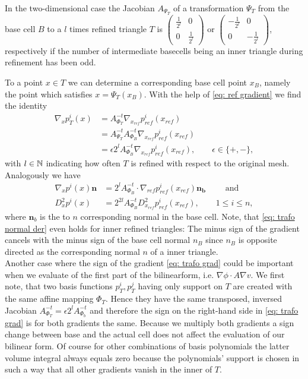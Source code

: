 \begin{example}\label{ex: leaf cell trafo}
In the two-dimensional case the Jacobian $A_{\Psi_T}$ of a transformation $\Psi_T$ from the base cell $B$ to a $l$ times refined triangle $T$ is $
	\begin{pmatrix}
		\frac 1 {2^l} & 0 \\ 0 & \frac 1 {2^l}
	\end{pmatrix} \text{ or }
	\begin{pmatrix}
		-\frac 1 {2^l} & 0 \\ 0 & -\frac 1 {2^l}
	\end{pmatrix}$, respectively if the number of intermediate basecells being an inner triangle during refinement  has been odd.

 To a point $x \in T$ we can determine a corresponding base cell point $x_B$, namely the point which satisfies $x = \Psi_T(x_B)$. With the help of \eqref{eq: ref gradient} we find the identity
\begin{align}
\nabla_x p_T^i(x) &= A_{\Phi_T}^{-t} \nabla_{x_{ref}} p^i_{ref} (x_{ref}) \nonumber\\
 &= A_{\Psi_T}^{-t} A_{\Phi_B}^{-t} \nabla_{x_{ref}} p^i_{ref} (x_{ref}) \nonumber\\
&= \epsilon 2^l A_{\Phi_B}^{-t} \nabla_{x_{ref}} p^i_{ref}(x_{ref}), \qquad \epsilon \in \{+,-\} \label{eq: trafo grad},
\end{align}
with $l \in \mathbb{N}$ indicating how often $T$ is refined with respect to the original mesh.\\
Analogously we have
\begin{align}
\nabla_x p^i(x) \mathbf n &= 2^l  A_{\Phi_B}^{-t} \cdot \nabla_{ref}p^i_{ref}(x_{ref}) \mathbf{ n_{b}} \qquad \text{ and } \label{eq: trafo normal der} \\
D_x^2 p^i(x) &= 2^{2l}  A_{\Phi_B}^{-t} D_{x_{ref}}^2 p^i_{ref}(x_{ref}), \qquad 1 \leq i \leq n,
\end{align}
where $\mathbf n_b$ is the to $n$ corresponding normal in the base cell. Note, that \eqref{eq: trafo normal der} even holds for inner refined triangles: The minus sign of the gradient cancels with the minus sign of the base cell normal $n_B$ since $n_B$ is opposite directed as the corresponding normal $n$ of a inner triangle.\\
Another case where the sign of the gradient \eqref{eq: trafo grad} could be important when we evaluate of the first part of the bilinearform, i.e. $\nabla \phi \cdot A \nabla v$. We first note, that two basis functions $p_T^i, p_T^j$ having only support on $T$ are created with the same affine mapping $\Phi_T$. Hence they have the same transposed, inversed Jacobian $A^{-t}_{\Phi_T}=\epsilon 2^l A_{\Phi_b}^{-t}$ and therefore the sign on the right-hand side in \eqref{eq: trafo grad} is for both gradients the same. Because we multiply both gradients a sign change between base and the actual cell does not affect the evaluation of our bilinear form. 
Of course for other combinations of basis polynomials the latter volume integral always equals zero because the polynomials' support is chosen in such a way that all other gradients vanish in the inner of $T$.


\end{example}
